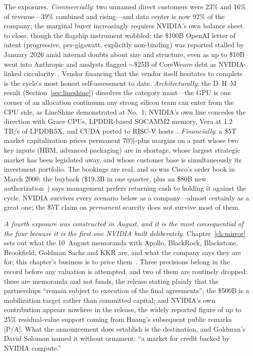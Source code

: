 The exposures. \emph{Commercially}: two unnamed direct customers were 23\% and 16\% of revenue---39\% combined and rising---and data center is now 92\% of the company; the marginal buyer increasingly requires NVIDIA's own balance sheet to close, though the flagship instrument wobbled: the \$100B OpenAI letter of intent (progressive, per-gigawatt, explicitly non-binding) was reported stalled by January 2026 amid internal doubts about size and structure, even as up to \$10B went into Anthropic and analysts flagged $\sim$\$25B of CoreWeave debt as NVIDIA-linked circularity~\cite{nvidia-concentration,nvidia-openai-stall}. Vendor financing that the vendor itself hesitates to complete is the cycle's most honest self-assessment to date. \emph{Architecturally}: the D--H--M result (Section~\ref{sec:lineshine}) dissolves the category moat---the GPU is one corner of an allocation continuum any strong silicon team can enter from the CPU side, as LineShine demonstrated at No.~1; NVIDIA's own line concedes the direction with Grace CPUs, LPDDR-based SOCAMM2 memory, Vera at 1.2\,TB/s of LPDDR5X, and CUDA ported to RISC-V hosts~\cite{dhm-long,socamm2,cuda-riscv}. \emph{Financially}: a \$5T market capitalization prices permanent 70\%-plus margins on a part whose two key inputs (HBM, advanced packaging) are in shortage, whose largest strategic market has been legislated away, and whose customer base is simultaneously its investment portfolio. The bookings are real, and so was Cisco's order book in March 2000; the buyback (\$19.3B in one quarter, plus an \$80B new authorization~\cite{nvidia2026}) says management prefers returning cash to holding it against the cycle. NVIDIA survives every scenario below as a company---almost certainly as a great one; the \$5T claim on \emph{permanent} scarcity does not survive most of them.

\emph{A fourth exposure was constructed in August, and it is the most consequential of the four because it is the first one NVIDIA built deliberately.} Chapter~\ref{ch:mirror} sets out what the 10~August memoranda with Apollo, BlackRock, Blackstone, Brookfield, Goldman Sachs and KKR are, and what the company says they are for; this chapter's business is to price them~\cite{nvda-500b}. Three precisions belong in the record before any valuation is attempted, and two of them are routinely dropped: these are memoranda and not funds, the release stating plainly that the partnerships ``remain subject to execution of the final agreements''; the \$500B is a mobilization target rather than committed capital; and NVIDIA's own contribution appears nowhere in the release, the widely reported figure of up to 25\% residual-value support coming from Huang's subsequent public remarks [P/A]. What the announcement does establish is the destination, and Goldman's David Solomon named it without ornament: ``a market for credit backed by NVIDIA compute.''

